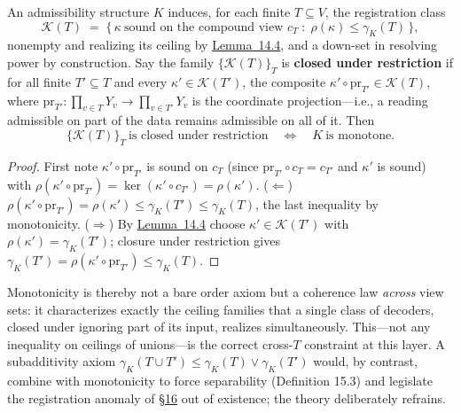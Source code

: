 \begin{thmplain}

An admissibility structure \(K\) induces, for each finite \(T \subseteq V\), the registration class
\[
\mathcal{K}(T) \;=\; \{\, \kappa \ \text{sound on the compound view } c_T \;:\; \rho(\kappa) \le \gamma_K(T) \,\},
\]
nonempty and realizing its ceiling by \hyperlink{stmt:14.4}{Lemma~14.4}, and a down-set in resolving power by construction. Say the family \(\{\mathcal{K}(T)\}_T\) is \textbf{closed under restriction} if for all finite \(T' \subseteq T\) and every \(\kappa' \in \mathcal{K}(T')\), the composite \(\kappa' \circ \mathrm{pr}_{T'} \in \mathcal{K}(T)\), where \(\mathrm{pr}_{T'} : \prod_{v \in T} Y_v \to \prod_{v \in T'} Y_v\) is the coordinate projection---\hspace{0pt}i.e., a reading admissible on part of the data remains admissible on all of it. Then
\[
\{\mathcal{K}(T)\}_T \ \text{is closed under restriction} \quad\iff\quad K \ \text{is monotone}.
\]
\end{thmplain}

\begin{proof}

First note \(\kappa' \circ \mathrm{pr}_{T'}\) is sound on \(c_T\) (since \(\mathrm{pr}_{T'} \circ c_T = c_{T'}\) and \(\kappa'\) is sound) with \(\rho(\kappa' \circ \mathrm{pr}_{T'}) = \ker(\kappa' \circ c_{T'}) = \rho(\kappa')\). (\(\Leftarrow\)) \(\rho(\kappa' \circ \mathrm{pr}_{T'}) = \rho(\kappa') \le \gamma_K(T') \le \gamma_K(T)\), the last inequality by monotonicity. (\(\Rightarrow\)) By \hyperlink{stmt:14.4}{Lemma~14.4} choose \(\kappa' \in \mathcal{K}(T')\) with \(\rho(\kappa') = \gamma_K(T')\); closure under restriction gives \(\gamma_K(T') = \rho(\kappa' \circ \mathrm{pr}_{T'}) \le \gamma_K(T)\).
\end{proof}

Monotonicity is thereby not a bare order axiom but a coherence law \emph{across} view sets: it characterizes exactly the ceiling families that a single class of decoders, closed under ignoring part of its input, realizes simultaneously. This---\hspace{0pt}not any inequality on ceilings of unions---\hspace{0pt}is the correct cross-\(T\) constraint at this layer. A subadditivity axiom \(\gamma_K(T \cup T') \le \gamma_K(T) \vee \gamma_K(T')\) would, by contrast, combine with monotonicity to force separability (Definition 15.3) and legislate the registration anomaly of \hyperlink{sec:16}{§16} out of existence; the theory deliberately refrains.

